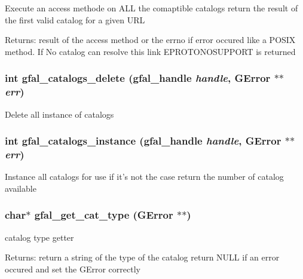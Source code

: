 Execute an access methode on ALL the comaptible catalogs return the result of the first valid catalog for a given URL \begin{Desc}
\item[Returns:]result of the access method or the errno if error occured like a POSIX method. If No catalog can resolve this link EPROTONOSUPPORT is returned \end{Desc}
\subsubsection{\setlength{\rightskip}{0pt plus 5cm}int gfal\_\-catalogs\_\-delete (gfal\_\-handle {\em handle}, GError $\ast$$\ast$ {\em err})}\label{gfal__common__catalog_8h_405974336e7b4ebaafeea02577d7d4d5}


Delete all instance of catalogs 
\subsubsection{\setlength{\rightskip}{0pt plus 5cm}int gfal\_\-catalogs\_\-instance (gfal\_\-handle {\em handle}, GError $\ast$$\ast$ {\em err})}\label{gfal__common__catalog_8h_d272f75eb549a72064524ecce3c25fe7}


Instance all catalogs for use if it's not the case return the number of catalog available 
\subsubsection{\setlength{\rightskip}{0pt plus 5cm}char$\ast$ gfal\_\-get\_\-cat\_\-type (GError $\ast$$\ast$)}\label{gfal__common__catalog_8h_791ad55a9c8aaca0bb8ae74a3538c202}


catalog type getter 

\begin{Desc}
\item[Returns:]return a string of the type of the catalog return NULL if an error occured and set the GError correctly \end{Desc}
